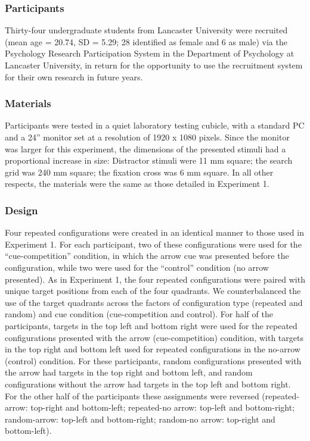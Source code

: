\documentclass[
  man,
  floatsintext,
  longtable,
  nolmodern,
  notxfonts,
  notimes,
  colorlinks=true,linkcolor=blue,citecolor=blue,urlcolor=blue]{apa7}
\begin{document}
\subsubsection{Participants}\label{participants-1}

Thirty-four undergraduate students from Lancaster University were
recruited (mean age = 20.74, SD = 5.29; 28 identified as female and 6 as
male) via the Psychology Research Participation System in the Department
of Psychology at Lancaster University, in return for the opportunity to
use the recruitment system for their own research in future years.

\subsubsection{Materials}\label{materials-1}

Participants were tested in a quiet laboratory testing cubicle, with a
standard PC and a 24'' monitor set at a resolution of 1920 x 1080
pixels. Since the monitor was larger for this experiment, the dimensions
of the presented stimuli had a proportional increase in size: Distractor
stimuli were 11 mm square; the search grid was 240 mm square; the
fixation cross was 6 mm square. In all other respects, the materials
were the same as those detailed in Experiment 1.

\subsubsection{Design}\label{design-1}

Four repeated configurations were created in an identical manner to
those used in Experiment 1. For each participant, two of these
configurations were used for the ``cue-competition'' condition, in which
the arrow cue was presented before the configuration, while two were
used for the ``control'' condition (no arrow presented). As in
Experiment 1, the four repeated configurations were paired with unique
target positions from each of the four quadrants. We counterbalanced the
use of the target quadrants across the factors of configuration type
(repeated and random) and cue condition (cue-competition and control).
For half of the participants, targets in the top left and bottom right
were used for the repeated configurations presented with the arrow
(cue-competition) condition, with targets in the top right and bottom
left used for repeated configurations in the no-arrow (control)
condition. For these participants, random configurations presented with
the arrow had targets in the top right and bottom left, and random
configurations without the arrow had targets in the top left and bottom
right. For the other half of the participants these assignments were
reversed (repeated-arrow: top-right and bottom-left; repeated-no arrow:
top-left and bottom-right; random-arrow: top-left and bottom-right;
random-no arrow: top-right and bottom-left).
\end{document}
